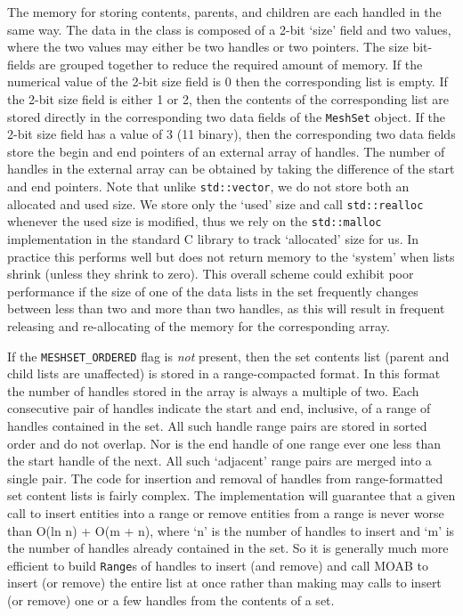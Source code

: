 \documentclass{report}
\begin{document}
The memory for storing contents, parents, and children are each handled in the same way.  The data in the class is composed of a 2-bit `size' field and two values, where the two values may either be two handles or two pointers.  The size bit-fields are grouped together to reduce the required amount of memory.  If the numerical value of the 2-bit size field is 0 then the corresponding list is empty.  If the 2-bit size field is either 1 or 2, then the contents of the corresponding list are stored directly in the corresponding two data fields of the \texttt{MeshSet} object.  If the 2-bit size field has a value of 3 (11 binary), then the corresponding two data fields store the begin and end pointers of an external array of handles.  The number of handles in the external array can be obtained by taking the difference of the start and end pointers.  Note that unlike \texttt{std::vector}, we do not store both an allocated and used size.  We store only the `used' size and call \texttt{std::realloc} whenever the used size is modified, thus we rely on the \texttt{std::malloc} implementation in the standard C library to track `allocated' size for us.  In practice this performs well but does not return memory to the `system' when lists shrink (unless they shrink to zero).  This overall scheme could exhibit poor performance if the size of one of the data lists in the set frequently changes between less than two and more than two handles, as this will result in frequent releasing and re-allocating of the memory for the corresponding array.

If the \texttt{MESHSET\_ORDERED} flag is {\em not} present, then the set contents list (parent and child lists are unaffected) is stored in a range-compacted format.  In this format the number of handles stored in the array is always a multiple of two.  Each consecutive pair of handles indicate the start and end, inclusive, of a range of handles contained in the set.  All such handle range pairs are stored in sorted order and do not overlap.  Nor is the end handle of one range ever one less than the start handle of the next.  All such `adjacent' range pairs are merged into a single pair.  The code for insertion and removal of handles from range-formatted set content lists is fairly complex.  The implementation will guarantee that a given call to insert entities into a range or remove entities from a range is never worse than O(ln n) + O(m + n), where `n' is the number of handles to insert and `m' is the number of handles already contained in the set.  So it is generally much more efficient to build \texttt{Range}s of handles to insert (and remove) and call MOAB to insert (or remove) the entire list at once rather than making may calls to insert (or remove) one or a few handles from the contents of a set.
\end{document}
